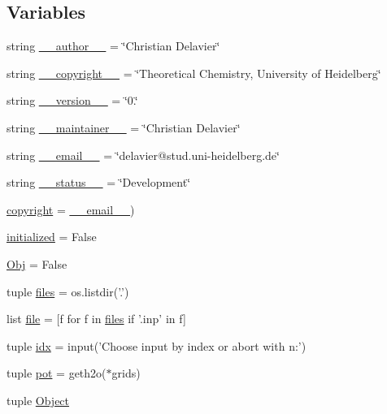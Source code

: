 \subsection*{Variables}
\begin{DoxyCompactItemize}
\item 
string \hyperlink{namespace_a_l_s_1_1____main_____a261654567d538abacdaa62275d0839f9}{\+\_\+\+\_\+author\+\_\+\+\_\+} = \char`\"{}Christian Delavier\char`\"{}
\item 
string \hyperlink{namespace_a_l_s_1_1____main_____aa789b32fba45101c1352cea971ff935e}{\+\_\+\+\_\+copyright\+\_\+\+\_\+} = \char`\"{}Theoretical Chemistry, University of Heidelberg\char`\"{}
\item 
string \hyperlink{namespace_a_l_s_1_1____main_____aff934e6ec8e8870ccc1356e92dd9f909}{\+\_\+\+\_\+version\+\_\+\+\_\+} = \char`\"{}0.\char`\"{}
\item 
string \hyperlink{namespace_a_l_s_1_1____main_____a5d02f90371afbc284e67f8b7627522bb}{\+\_\+\+\_\+maintainer\+\_\+\+\_\+} = \char`\"{}Christian Delavier\char`\"{}
\item 
string \hyperlink{namespace_a_l_s_1_1____main_____a0251675f23b74ea7707de3d1e69ce70f}{\+\_\+\+\_\+email\+\_\+\+\_\+} = \char`\"{}delavier@stud.\+uni-\/heidelberg.\+de\char`\"{}
\item 
string \hyperlink{namespace_a_l_s_1_1____main_____a6247bb85beb0771399c7ab617b11d74e}{\+\_\+\+\_\+status\+\_\+\+\_\+} = \char`\"{}Development\char`\"{}
\item 
\hyperlink{namespace_a_l_s_1_1____main_____a3865f3dc40606d46564c911de0639778}{copyright} = \hyperlink{namespace_a_l_s_1_1____main_____a0251675f23b74ea7707de3d1e69ce70f}{\+\_\+\+\_\+email\+\_\+\+\_\+})
\item 
\hyperlink{namespace_a_l_s_1_1____main_____aa9daddee8a81563388242dfedc17c588}{initialized} = False
\item 
\hyperlink{namespace_a_l_s_1_1____main_____ab3aa61ab51823df019a351f6bb82b138}{Obj} = False
\item 
tuple \hyperlink{namespace_a_l_s_1_1____main_____a0d16fe12e38a76b5e5c925f6f685b55b}{files} = os.\+listdir('.')
\item 
list \hyperlink{namespace_a_l_s_1_1____main_____aa5b527ae9e22a81c1b94a9de1950f075}{file} = \mbox{[}f for f in \hyperlink{namespace_a_l_s_1_1____main_____a0d16fe12e38a76b5e5c925f6f685b55b}{files} if '.inp' in f\mbox{]}
\item 
tuple \hyperlink{namespace_a_l_s_1_1____main_____a5aa0409d9d67fa40ab9ea2c561dacb51}{idx} = input('Choose input by index or abort with n\+:')
\item 
tuple \hyperlink{namespace_a_l_s_1_1____main_____ac0e196b18c2c5ce3593885fa2cd7174c}{pot} = geth2o($\ast$grids)
\item 
tuple \hyperlink{namespace_a_l_s_1_1____main_____a610b87b76246245771ea935477540795}{Object}
\end{DoxyCompactItemize}


